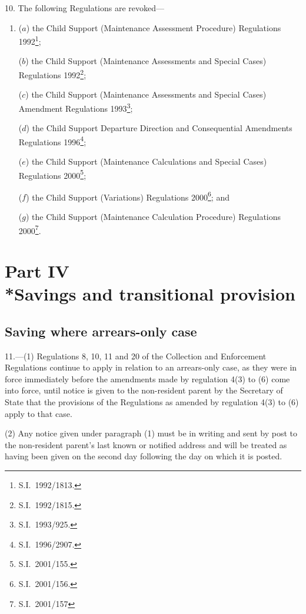 \documentclass[12pt,a4paper]{article}
\begin{document}
10.  The following Regulations are revoked—
\begin{enumerate}\item[]
($a$) the Child Support (Maintenance Assessment Procedure) Regulations 1992\footnote{S.I.~1992/1813.};

($b$) the Child Support (Maintenance Assessments and Special Cases) Regulations 1992\footnote{S.I.~1992/1815.};

($c$) the Child Support (Maintenance Assessments and Special Cases) Amendment Regulations 1993\footnote{S.I.~1993/925.};

($d$) the Child Support Departure Direction and Consequential Amendments Regulations 1996\footnote{S.I.~1996/2907.};

($e$) the Child Support (Maintenance Calculations and Special Cases) Regulations 2000\footnote{S.I.\ 2001/155.};

($f$) the Child Support (Variations) Regulations 2000\footnote{S.I.~2001/156.}; and

($g$) the Child Support (Maintenance Calculation Procedure) Regulations 2000\footnote{S.I.~2001/157}.
\end{enumerate}

\section[Part IV --- Savings and transitional provision]{Part IV\\*Savings and transitional provision}

\renewcommand\parthead{--- Part IV}

\subsection[11. Saving where arrears-only case]{Saving where arrears-only case}

11.---(1)  Regulations 8, 10, 11 and 20 of the Collection and Enforcement Regulations continue to apply in relation to an arrears-only case, as they were in force immediately before the amendments made by regulation 4(3) to (6) come into force, until notice is given to the non-resident parent by the Secretary of State that the provisions of the Regulations as amended by regulation 4(3) to (6) apply to that case.

(2) Any notice given under paragraph (1) must be in writing and sent by post to the non-resident parent’s last known or notified address and will be treated as having been given on the second day following the day on which it is posted.
\end{document}
